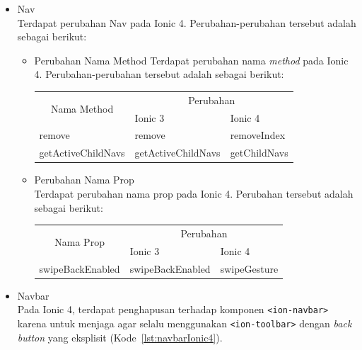 \begin{enumerate}
\begin{enumerate}
\begin{itemize}
\begin{itemize}
				\item Nav \\
				Terdapat perubahan Nav pada Ionic 4. Perubahan-perubahan tersebut adalah sebagai berikut:
				\begin{itemize}
					\item Perubahan Nama Method 
					Terdapat perubahan nama {\it method} pada Ionic 4. Perubahan-perubahan tersebut adalah sebagai berikut:
\begin{table}[H]
\centering
\begin{tabular}{|l|ll|}
\hline
\multicolumn{1}{|c|}{\multirow{2}{*}{Nama Method}} & \multicolumn{2}{c|}{Perubahan}                         \\ \cline{2-3} 
\multicolumn{1}{|c|}{}                             & \multicolumn{1}{l|}{Ionic 3}            & Ionic 4      \\ \hline
remove                                             & \multicolumn{1}{l|}{remove}             & removeIndex  \\ \hline
getActiveChildNavs                                 & \multicolumn{1}{l|}{getActiveChildNavs} & getChildNavs \\ \hline
\end{tabular}
\end{table}					

					\item Perubahan Nama Prop \\
					Terdapat perubahan nama prop pada Ionic 4. Perubahan tersebut adalah sebagai berikut:\\

\begin{table}[H]
\centering
\begin{tabular}{|l|ll|}
\hline
\multicolumn{1}{|c|}{\multirow{2}{*}{Nama Prop}} & \multicolumn{2}{c|}{Perubahan}                         \\ \cline{2-3} 
\multicolumn{1}{|c|}{}                           & \multicolumn{1}{l|}{Ionic 3}            & Ionic 4      \\ \hline
swipeBackEnabled                                 & \multicolumn{1}{l|}{swipeBackEnabled}   & swipeGesture  \\ \hline
\end{tabular}
\end{table}		
				\end{itemize}	

				\item Navbar \\
				Pada Ionic 4, terdapat penghapusan terhadap komponen \texttt{<ion-navbar>} karena untuk menjaga agar selalu menggunakan \texttt{<ion-toolbar>} dengan {\it back button} yang eksplisit (Kode~\ref{lst:navbarIonic4}).				
				

\end{itemize}
\end{itemize}
\end{enumerate}
\end{enumerate}
